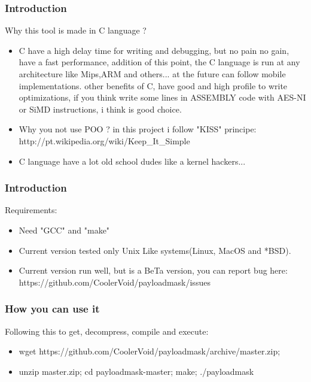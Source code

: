 \documentclass[serif,mathserif]{beamer}
\begin{document}
\begin{frame}
  \frametitle{Introduction}
  Why this tool is made in C language ?
  \begin{itemize}
  \item  C have a high delay time for writing and debugging, but no pain no gain, have a fast performance, addition of this point, the C language is run at any architecture like Mips,ARM and others... at the future can follow mobile implementations. other benefits of C,  have good and high profile to write optimizations, if you think write some lines in ASSEMBLY code with AES-NI or SiMD instructions, i think is good choice. 
  \item  Why you not use POO ? in this project i follow "KISS" principe: http://pt.wikipedia.org/wiki/Keep\_It\_Simple
  \item  C language have a lot old school dudes like a kernel hackers... 
  \end{itemize}
\end{frame}



\begin{frame}
  \frametitle{Introduction}
  Requirements:
  \begin{itemize}
  \item  Need "GCC" and "make" 
  \item  Current version tested only Unix Like systems(Linux, MacOS and *BSD).
  \item  Current version run well, but is a BeTa version, you can report bug here: https://github.com/CoolerVoid/payloadmask/issues
  \end{itemize}
\end{frame}


\begin{frame}
  \frametitle{How you can use it}
  Following this to get, decompress, compile and execute:
  \begin{itemize}
  \item wget https://github.com/CoolerVoid/payloadmask/archive/master.zip; 
  \item unzip master.zip; cd payloadmask-master; make; ./payloadmask
  \end{itemize}
\end{frame}
\end{document}
